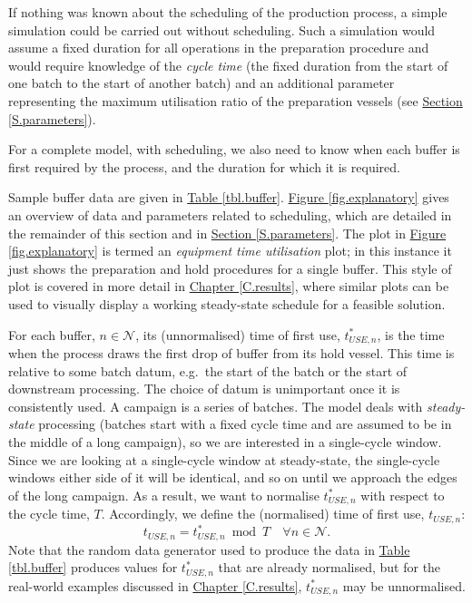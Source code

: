 If nothing was known about the scheduling of the production process, a simple
simulation could be carried out without scheduling.
Such a simulation would assume a fixed duration for all operations in the
preparation procedure and would require knowledge of the \emph{cycle time} (the
fixed duration from the start of one batch to the start of another batch) and
an additional parameter representing the maximum utilisation ratio of the
preparation vessels (see \hyperref[S.parameters]{Section \ref*{S.parameters}}).

For a complete model, with scheduling, we also need to know when each buffer
is first required by the process, and the duration for which it is required.

Sample buffer data are given in \hyperref[tbl.buffer]{Table \ref*{tbl.buffer}}.
\hyperref[fig.explanatory]{Figure \ref*{fig.explanatory}} gives an overview of
data and parameters related to scheduling, which are detailed in the remainder
of this section and in \hyperref[S.parameters]{Section \ref*{S.parameters}}.
The plot in \hyperref[fig.explanatory]{Figure \ref*{fig.explanatory}} is
termed an \emph{equipment time utilisation} plot; in this instance it just
shows the preparation and hold procedures for a single buffer.
This style of plot is covered in more detail in
\hyperref[C.results]{Chapter \ref*{C.results}}, where similar plots can be used
to visually display a working steady-state schedule for a feasible solution.

For each buffer, $n \in \mathcal{N}$, its (unnormalised) time of first use,
$t_{\mathit{USE},n}^{*}$, is the time when the process draws the first drop of
buffer from its hold vessel.
This time is relative to some batch datum, e.g.\ the start of the batch or the
start of downstream processing.
The choice of datum is unimportant once it is consistently used.
A campaign is a series of batches. 
The model deals with \emph{steady-state} processing (batches start with a fixed
cycle time and are assumed to be in the middle of a long campaign), so we are
interested in a single-cycle window.
Since we are looking at a single-cycle window at steady-state, the single-cycle
windows either side of it will be identical, and so on until we approach the
edges of the long campaign.
As a result, we want to normalise $t_{\mathit{USE},n}^{*}$ with respect to the
cycle time, $T$.
Accordingly, we define the (normalised) time of first use,
$t_{\mathit{USE},n}$:
\begin{equation}
    t_{\mathit{USE},n} = t_{\mathit{USE},n}^{*} \enspace \text{mod} \enspace 
    T \quad \forall n \in \mathcal{N}.
\end{equation}
Note that the random data generator used to produce the data in 
\hyperref[tbl.buffer]{Table \ref*{tbl.buffer}} produces values for 
$t_{\mathit{USE},n}^{*}$ that are already normalised, but for the real-world
examples discussed in \hyperref[C.results]{Chapter \ref*{C.results}}, 
$t_{\mathit{USE},n}^{*}$ may be unnormalised.

